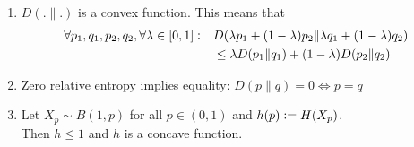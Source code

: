 \begin{theorem} \label{theorem:convexity-of-entropy}
    \begin{enumerate}
        \item
            $D(. \| .)$ is a convex function. This means that
            \[
                \begin{aligned}
                \forall p_1, q_1, p_2, q_2, \forall \lambda \in [0, 1]\vcentcolon \quad
                &D(\lambda p_1 + (1-\lambda) p_2 \| \lambda q_1 + (1-\lambda) q_2) \\
                &\le \lambda D(p_1 \| q_1) + (1 - \lambda) D(p_2 \| q_2)
                \end{aligned}
            \]
	
	\item
	    Zero relative entropy implies equality: $D(p \| q) = 0 \iff p = q$

        \item
            Let $X_p \sim B(1, p)$ for all $p \in (0, 1)$ and $h(p) \vcentcolon= H(X_p)$. \\
            Then $h \le 1$ and $h$ is a concave function.

    \end{enumerate}
\end{theorem}
